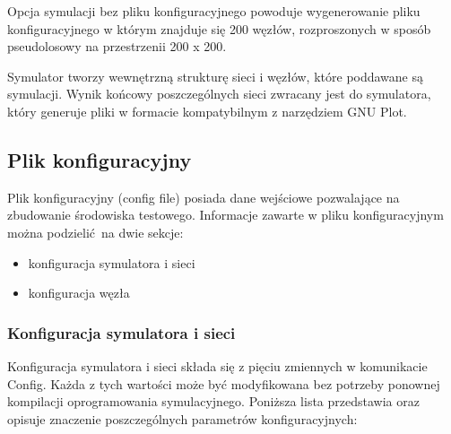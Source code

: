 \documentclass[a4paper,12pt,twoside,openany]{report}
\begin{document}
Opcja symulacji bez pliku konfiguracyjnego powoduje wygenerowanie pliku konfiguracyjnego w którym znajduje się 200 węzłów, rozproszonych w sposób
pseudolosowy na przestrzenii 200 x 200.

Symulator tworzy wewnętrzną strukturę sieci i węzłów, które poddawane są symulacji. Wynik końcowy poszczególnych sieci zwracany jest do symulatora, który
generuje pliki w formacie kompatybilnym z narzędziem GNU Plot. 

\subsection{Plik konfiguracyjny}

Plik konfiguracyjny (config file) posiada dane wejściowe pozwalające na zbudowanie środowiska testowego. 
Informacje zawarte w pliku konfiguracyjnym można podzielić na dwie sekcje:

\begin{itemize}
 \item konfiguracja symulatora i sieci
 \item konfiguracja węzła
\end{itemize}

\subsubsection{Konfiguracja symulatora i sieci}

Konfiguracja symulatora i sieci składa się z pięciu zmiennych w komunikacie Config. Każda z tych wartości może być modyfikowana bez potrzeby
ponownej kompilacji oprogramowania symulacyjnego. Poniższa lista przedstawia oraz opisuje znaczenie poszczególnych parametrów konfiguracyjnych:
\end{document}
